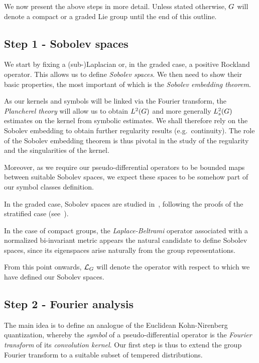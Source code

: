 We now present the above steps in more detail.
Unless stated otherwise,
$G$ will denote a compact or a graded Lie group until the end of this outline.

\subsection*{Step 1 - Sobolev spaces}

We start by fixing a (sub-)Laplacian or, in the graded case, a positive Rockland operator.
This allows us to define \emph{Sobolev spaces}.
We then need to show their basic properties,
the most important of which is the \emph{Sobolev embedding theorem}.

As our kernels and symbols will be linked via the Fourier transform,
the \emph{Plancherel theory} will allow us to obtain ${L^{2} (G)}$ and more generally $L^2_{s}(G)$ estimates on the kernel from symbolic estimates.
We shall therefore rely on the Sobolev embedding to obtain further regularity results (e.g.~continuity).
The role of the Sobolev embedding theorem is thus pivotal in the study of the regularity and the singularities of the kernel.

Moreover,
as we require our pseudo-differential operators to be bounded maps between suitable Sobolev spaces,
we expect these spaces to be somehow part of our symbol classes definition.

In the graded case,
Sobolev spaces are studied in~\cite[Chapter 4]{FischerRuzhansky16},
following the proofs of the stratified case (see~\cite{Folland75}).

In the case of compact groups,
the \emph{Laplace-Beltrami} operator associated with a normalized bi-invariant metric appears the natural candidate to define Sobolev spaces,
since its eigenspaces arise naturally from the group representations.

From this point onwards,
${\mathcal{L}_{G}}$ will denote the operator with respect to which we have defined our Sobolev spaces.

\subsection*{Step 2 - Fourier analysis}

The main idea is to define an analogue of the Euclidean Kohn-Nirenberg quantization,
whereby the \emph{symbol} of a pseudo-differential operator is the \emph{Fourier transform} of its \emph{convolution kernel}.
Our first step is thus to extend the group Fourier transform to a suitable subset of tempered distributions.

